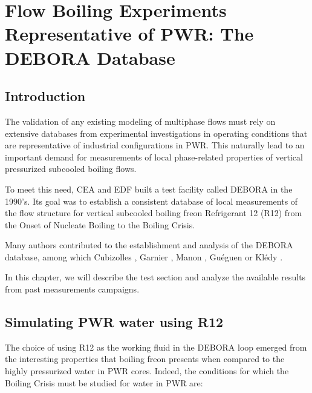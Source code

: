 
\chapter{Flow Boiling Experiments Representative of PWR:  The DEBORA Database} %
\label{chap:debora}

\minitoc

\section{Introduction}

\label{ch:debora} %

The validation of any existing modeling of multiphase flows must rely on extensive databases from experimental investigations in operating conditions that are representative of industrial configurations in PWR. This naturally lead to an important demand for measurements of local phase-related properties of vertical pressurized subcooled boiling flows. 

\npar
To meet this need, CEA and EDF built a test facility called DEBORA in the 1990's. Its goal was to establish a consistent database of local measurements of the flow structure for vertical subcooled boiling freon Refrigerant 12 (R12) from the Onset of Nucleate Boiling to the Boiling Crisis.

\npar

Many authors contributed to the establishment and analysis of the DEBORA database, among which Cubizolles \cite{cubizolles_etude_1996}, Garnier \etal \cite{garnier_local_2001}, Manon \cite{manon_contribution_2000}, Guéguen \cite{gueguen_contribution_2013} or Klédy \cite{kledy_developpement_2018}.

\npar

In this chapter, we will describe the test section and analyze the available results from past measurements campaigns.


\section{Simulating PWR water using R12}

The choice of using R12 as the working fluid in the DEBORA loop emerged from the interesting properties that boiling freon presents when compared to the highly pressurized water in PWR cores. Indeed, the conditions for which the Boiling Crisis must be studied for water in PWR are:

